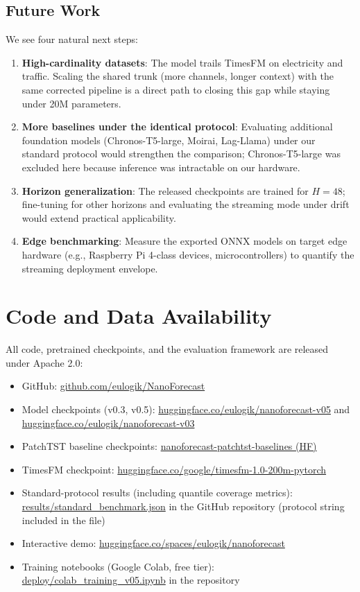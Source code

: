 \documentclass[11pt]{article}
\begin{document}
\subsection{Future Work}

We see four natural next steps:

\begin{enumerate}
\item \textbf{High-cardinality datasets}: The model trails TimesFM on electricity and traffic. Scaling the shared trunk (more channels, longer context) with the same corrected pipeline is a direct path to closing this gap while staying under 20M parameters.
\item \textbf{More baselines under the identical protocol}: Evaluating additional foundation models (Chronos-T5-large, Moirai, Lag-Llama) under our standard protocol would strengthen the comparison; Chronos-T5-large was excluded here because inference was intractable on our hardware.
\item \textbf{Horizon generalization}: The released checkpoints are trained for $H=48$; fine-tuning for other horizons and evaluating the streaming mode under drift would extend practical applicability.
\item \textbf{Edge benchmarking}: Measure the exported ONNX models on target edge hardware (e.g., Raspberry Pi 4-class devices, microcontrollers) to quantify the streaming deployment envelope.
\end{enumerate}

\section*{Code and Data Availability}

All code, pretrained checkpoints, and the evaluation framework are released under Apache 2.0:

\begin{itemize}
\item GitHub: \href{https://github.com/eulogik/NanoForecast}{github.com/eulogik/NanoForecast}
\item Model checkpoints (v0.3, v0.5): \href{https://huggingface.co/eulogik/nanoforecast-v05}{huggingface.co/eulogik/nanoforecast-v05} and \href{https://huggingface.co/eulogik/nanoforecast-v03}{huggingface.co/eulogik/nanoforecast-v03}
\item PatchTST baseline checkpoints: \href{https://huggingface.co/eulogik/nanoforecast-patchtst-baselines}{nanoforecast-patchtst-baselines (HF)}
\item TimesFM checkpoint: \href{https://huggingface.co/google/timesfm-1.0-200m-pytorch}{huggingface.co/google/timesfm-1.0-200m-pytorch}
\item Standard-protocol results (including quantile coverage metrics): \url{results/standard_benchmark.json} in the GitHub repository (protocol string included in the file)
\item Interactive demo: \href{https://huggingface.co/spaces/eulogik/nanoforecast}{huggingface.co/spaces/eulogik/nanoforecast}
\item Training notebooks (Google Colab, free tier): \url{deploy/colab_training_v05.ipynb} in the repository
\end{itemize}
\end{document}
